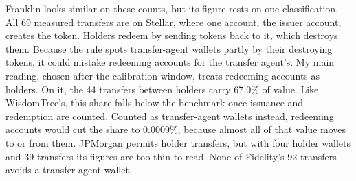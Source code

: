 \documentclass[12pt,a4paper]{article}
\begin{document}
Franklin looks similar on these counts, but its figure rests on one classification. All 69 measured transfers are on Stellar, where one account, the issuer account, creates the token. Holders redeem by sending tokens back to it, which destroys them. Because the rule spots transfer-agent wallets partly by their destroying tokens, it could mistake redeeming accounts for the transfer agent's. My main reading, chosen after the calibration window, treats redeeming accounts as holders. On it, the 44 transfers between holders carry 67.0\% of value. Like WisdomTree's, this share falls below the benchmark once issuance and redemption are counted. Counted as transfer-agent wallets instead, redeeming accounts would cut the share to 0.0009\%, because almost all of that value moves to or from them. JPMorgan permits holder transfers, but with four holder wallets and 39 transfers its figures are too thin to read. None of Fidelity's 92 transfers avoids a transfer-agent wallet.
\end{document}
